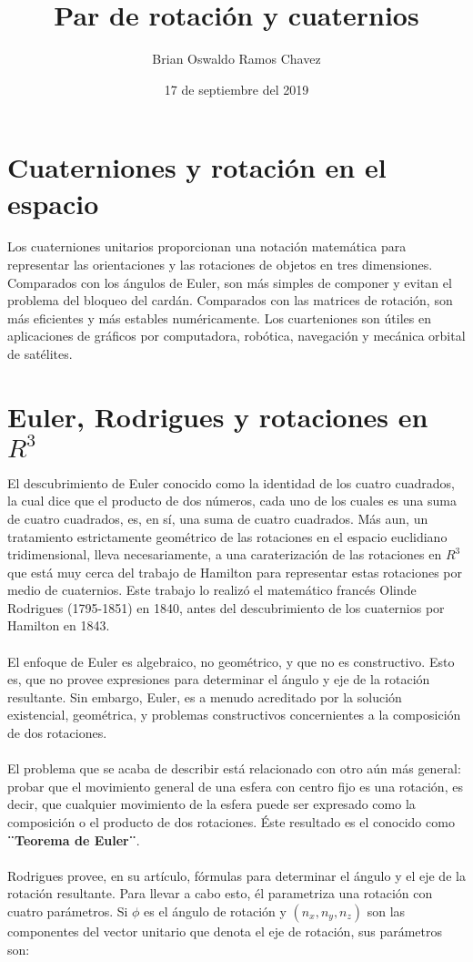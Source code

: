 \documentclass[12pt,a4paper]{report}
\author{Brian Oswaldo Ramos Chavez}
\title{Par de rotación y cuaternios}
\date{17 de septiembre del 2019}
\begin{document}
\maketitle
\section{Cuaterniones y rotación en el espacio}
Los cuaterniones unitarios proporcionan una notación matemática para representar las orientaciones y las rotaciones de objetos en tres dimensiones. Comparados con los ángulos de Euler, son más simples de componer y evitan el problema del bloqueo del cardán. Comparados con las matrices de rotación, son más eficientes y más estables numéricamente. Los cuarteniones son útiles en aplicaciones de gráficos por computadora, robótica, navegación y mecánica orbital de satélites.
\section{Euler, Rodrigues y rotaciones en $R^{3}$}
El descubrimiento de Euler conocido como la identidad de los cuatro cuadrados, la cual dice que el producto de dos números, cada uno de los cuales es una suma de cuatro cuadrados, es, en sí, una suma de cuatro cuadrados.
Más aun, un tratamiento estrictamente geométrico de las rotaciones en el espacio euclidiano tridimensional, lleva necesariamente, a una caraterización de las
rotaciones en $R^{3}$ que está muy cerca del trabajo de Hamilton para representar estas rotaciones por medio de cuaternios. Este trabajo lo realizó el matemático francés Olinde Rodrigues (1795-1851) en 1840, antes del descubrimiento de los cuaternios por Hamilton en 1843.
\\\\El enfoque de Euler es algebraico, no geométrico, y que no es constructivo. Esto es, que no provee expresiones para determinar el ángulo y eje de la rotación resultante. Sin embargo, Euler, es a menudo acreditado por la solución existencial, geométrica, y problemas constructivos concernientes a la composición de dos rotaciones.
\\\\El problema que se acaba de describir está relacionado con otro aún más general:
probar que el movimiento general de una esfera con centro fijo es una rotación, es decir, que cualquier movimiento de la esfera puede ser expresado como la composición o el producto de dos rotaciones. Éste resultado es el conocido como \textbf{¨Teorema de Euler¨}.
\\\\Rodrigues provee, en su artículo, fórmulas para determinar el ángulo y el eje de la rotación resultante. Para llevar a cabo esto, él parametriza una rotación con cuatro parámetros. Si $\phi$ es el ángulo de rotación y $(n_{x},n_{y},n_{z})$ son las componentes del vector unitario que denota el eje de rotación, sus parámetros son:
\end{document}
